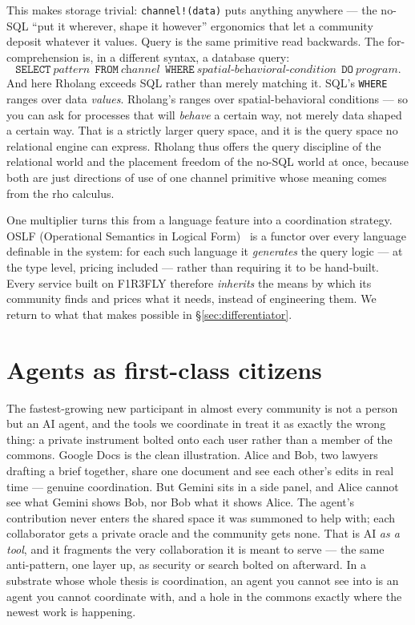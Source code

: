 \documentclass[11pt]{article}
\begin{document}
This makes storage trivial: \texttt{channel!(data)} puts anything anywhere --- the no-SQL ``put it wherever, shape it however'' ergonomics that let a community deposit whatever it values. Query is the same primitive read backwards. The for-comprehension is, in a different syntax, a database query:
\[
\texttt{SELECT}\ \textit{pattern}\ \ \texttt{FROM}\ \textit{channel}\ \ \texttt{WHERE}\ \textit{spatial-behavioral-condition}\ \ \texttt{DO}\ \textit{program}.
\]
And here Rholang exceeds SQL rather than merely matching it. SQL's \texttt{WHERE} ranges over data \emph{values}. Rholang's ranges over spatial-behavioral conditions --- so you can ask for processes that will \emph{behave} a certain way, not merely data shaped a certain way. That is a strictly larger query space, and it is the query space no relational engine can express. Rholang thus offers the query discipline of the relational world and the placement freedom of the no-SQL world at once, because both are just directions of use of one channel primitive whose meaning comes from the rho calculus.

One multiplier turns this from a language feature into a coordination strategy. OSLF (Operational Semantics in Logical Form)~\cite{namespaceLogic} is a functor over every language definable in the system: for each such language it \emph{generates} the query logic --- at the type level, pricing included --- rather than requiring it to be hand-built. Every service built on F1R3FLY therefore \emph{inherits} the means by which its community finds and prices what it needs, instead of engineering them. We return to what that makes possible in \S\ref{sec:differentiator}.

\section{Agents as first-class citizens}\label{sec:agents}

The fastest-growing new participant in almost every community is not a person but an AI agent, and the tools we coordinate in treat it as exactly the wrong thing: a private instrument bolted onto each user rather than a member of the commons. Google Docs is the clean illustration. Alice and Bob, two lawyers drafting a brief together, share one document and see each other's edits in real time --- genuine coordination. But Gemini sits in a side panel, and Alice cannot see what Gemini shows Bob, nor Bob what it shows Alice. The agent's contribution never enters the shared space it was summoned to help with; each collaborator gets a private oracle and the community gets none. That is AI \emph{as a tool}, and it fragments the very collaboration it is meant to serve --- the same anti-pattern, one layer up, as security or search bolted on afterward. In a substrate whose whole thesis is coordination, an agent you cannot see into is an agent you cannot coordinate with, and a hole in the commons exactly where the newest work is happening.
\end{document}
